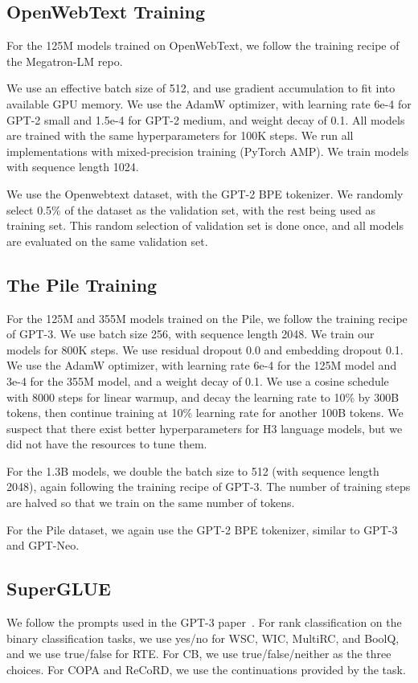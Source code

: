\documentclass{article}
\newcommand{\hthree}{\textsc{H3}\xspace}
\begin{document}
\subsection{OpenWebText Training}
For the 125M models trained on OpenWebText, we follow the training recipe of the Megatron-LM repo.

We use an effective batch size of 512, and use gradient accumulation to fit into
available GPU memory.
We use the AdamW optimizer, with learning rate 6e-4 for GPT-2 small and 1.5e-4
for GPT-2 medium, and weight decay of 0.1.
All models are trained with the same hyperparameters for 100K steps.
We run all implementations with mixed-precision training (PyTorch AMP).
We train models with sequence length 1024.

We use the Openwebtext dataset, with the GPT-2 BPE tokenizer. We randomly select
0.5\% of the dataset as the validation set, with the rest being used as training
set.
This random selection of validation set is done once, and all models are evaluated
on the same validation set.

\subsection{The Pile Training}
For the 125M and 355M models trained on the Pile, we follow the training recipe of GPT-3.
We use batch size 256, with sequence length 2048.
We train our models for 800K steps.
We use residual dropout 0.0 and embedding dropout 0.1.
We use the AdamW optimizer, with learning rate 6e-4 for the 125M model and 3e-4 for the 355M model, and a weight decay of 0.1.
We use a cosine schedule with 8000 steps for linear warmup, and decay the
learning rate to 10\% by 300B tokens, then continue training at 10\% learning
rate for another 100B tokens.
We suspect that there exist better hyperparameters for \hthree language models, but we did not have the resources to tune them.

For the 1.3B models, we double the batch size to 512 (with sequence length
2048), again following the training recipe of GPT-3. The number of training
steps are halved so that we train on the same number of tokens.

For the Pile dataset, we again use the GPT-2 BPE tokenizer, similar to GPT-3 and GPT-Neo.

\subsection{SuperGLUE}
We follow the prompts used in the GPT-3 paper~\citep{brown2020language}.
For rank classification on the binary classification tasks, we use yes/no for WSC, WIC, MultiRC, and BoolQ, and we use true/false for RTE.
For CB, we use true/false/neither as the three choices.
For COPA and ReCoRD, we use the continuations provided by the task.
\end{document}
